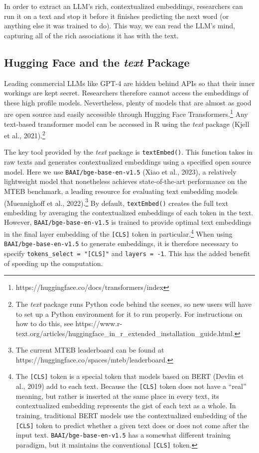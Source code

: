 \documentclass[
  man,
  floatsintext,
  longtable,
  nolmodern,
  notxfonts,
  notimes,
  colorlinks=true,linkcolor=blue,citecolor=blue,urlcolor=blue]{apa7}
\begin{document}
In order to extract an LLM's rich, contextualized embeddings,
researchers can run it on a text and stop it before it finishes
predicting the next word (or anything else it was trained to do). This
way, we can read the LLM's mind, capturing all of the rich associations
it has with the text.

\subsection{\texorpdfstring{Hugging Face and the \emph{text}
Package}{Hugging Face and the text Package}}\label{hugging-face-and-the-text-package}

Leading commercial LLMs like GPT-4 are hidden behind APIs so that their
inner workings are kept secret. Researchers therefore cannot access the
embeddings of these high profile models. Nevertheless, plenty of models
that are almost as good are open source and easily accessible through
Hugging Face Transformers.\footnote{https://huggingface.co/docs/transformers/index}
Any text-based transformer model can be accessed in R using the
\emph{text} package (Kjell et al., 2021).\footnote{The \emph{text}
  package runs Python code behind the scenes, so new users will have to
  set up a Python environment for it to run properly. For instructions
  on how to do this, see
  https://www.r-text.org/articles/huggingface\_in\_r\_extended\_installation\_guide.html.}

The key tool provided by the \emph{text} package is
\texttt{textEmbed()}. This function takes in raw texts and generates
contextualized embeddings using a specified open source model. Here we
use \texttt{BAAI/bge-base-en-v1.5} (Xiao et al., 2023), a relatively
lightweight model that nonetheless achieves state-of-the-art performance
on the MTEB benchmark, a leading resource for evaluating text embedding
models (Muennighoff et al., 2022).\footnote{The current MTEB leaderboard
  can be found at https://huggingface.co/spaces/mteb/leaderboard.} By
default, \texttt{textEmbed()} creates the full text embedding by
averaging the contextualized embeddings of each token in the text.
However, \texttt{BAAI/bge-base-en-v1.5} is trained to provide optimal
text embeddings in the final layer embedding of the \texttt{{[}CLS{]}}
token in particular.\footnote{The \texttt{{[}CLS{]}} token is a special
  token that models based on BERT (Devlin et al., 2019) add to each
  text. Because the \texttt{{[}CLS{]}} token does not have a ``real''
  meaning, but rather is inserted at the same place in every text, its
  contextualized embedding represents the gist of each text as a whole.
  In training, traditional BERT models use the contextualized embedding
  of the \texttt{{[}CLS{]}} token to predict whether a given text does
  or does not come after the input text. \texttt{BAAI/bge-base-en-v1.5}
  has a somewhat different training paradigm, but it maintains the
  conventional \texttt{{[}CLS{]}} token.} When using
\texttt{BAAI/bge-base-en-v1.5} to generate embeddings, it is therefore
necessary to specify \texttt{tokens\_select\ =\ "{[}CLS{]}"} and
\texttt{layers\ =\ -1}. This has the added benefit of speeding up the
computation.
\end{document}
